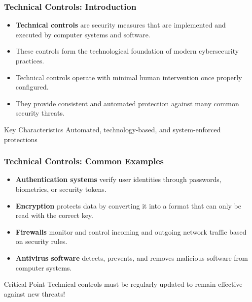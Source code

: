 \documentclass{beamer}
\begin{document}
\begin{frame}
    \frametitle{Technical Controls: Introduction}
    
    \begin{itemize}
        \item \textbf{Technical controls} are security measures that are implemented and executed by computer systems and software.
        
        \item These controls form the technological foundation of modern cybersecurity practices.
        
        \item Technical controls operate with minimal human intervention once properly configured.
        
        \item They provide consistent and automated protection against many common security threats.
    \end{itemize}
    
    \begin{block}{Key Characteristics}
        Automated, technology-based, and system-enforced protections
    \end{block}
\end{frame}

\begin{frame}
    \frametitle{Technical Controls: Common Examples}
    
    \begin{itemize}
        \item \textbf{Authentication systems} verify user identities through passwords, biometrics, or security tokens.
        
        \item \textbf{Encryption} protects data by converting it into a format that can only be read with the correct key.
        
        \item \textbf{Firewalls} monitor and control incoming and outgoing network traffic based on security rules.
        
        \item \textbf{Antivirus software} detects, prevents, and removes malicious software from computer systems.
    \end{itemize}
    
    \begin{alertblock}{Critical Point}
        Technical controls must be regularly updated to remain effective against new threats!
    \end{alertblock}
\end{frame}
\end{document}
